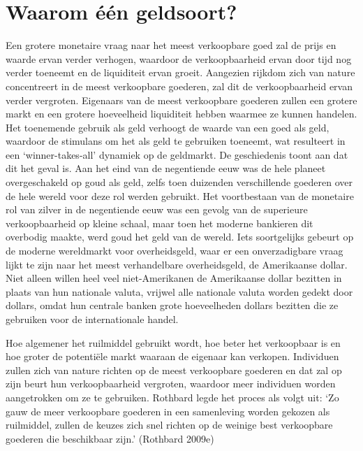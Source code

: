 \documentclass[
  a5paper,
  smalldemyvopaper,11pt,twoside,onecolumn,openright,extrafontsizes,
hidelinks]{memoir}
\begin{document}
\section{Waarom één geldsoort?}\label{waarom-euxe9n-geldsoort}

Een grotere monetaire vraag naar het meest verkoopbare goed zal de prijs
en waarde ervan verder verhogen, waardoor de verkoopbaarheid ervan door
tijd nog verder toeneemt en de liquiditeit ervan groeit. Aangezien
rijkdom zich van nature concentreert in de meest verkoopbare goederen,
zal dit de verkoopbaarheid ervan verder vergroten. Eigenaars van de
meest verkoopbare goederen zullen een grotere markt en een grotere
hoeveelheid liquiditeit hebben waarmee ze kunnen handelen. Het
toenemende gebruik als geld verhoogt de waarde van een goed als geld,
waardoor de stimulans om het als geld te gebruiken toeneemt, wat
resulteert in een `winner-takes-all' dynamiek op de geldmarkt. De
geschiedenis toont aan dat dit het geval is. Aan het eind van de
negentiende eeuw was de hele planeet overgeschakeld op goud als geld,
zelfs toen duizenden verschillende goederen over de hele wereld voor
deze rol werden gebruikt. Het voortbestaan van de monetaire rol van
zilver in de negentiende eeuw was een gevolg van de superieure
verkoopbaarheid op kleine schaal, maar toen het moderne bankieren dit
overbodig maakte, werd goud het geld van de wereld. Iets soortgelijks
gebeurt op de moderne wereldmarkt voor overheidsgeld, waar er een
onverzadigbare vraag lijkt te zijn naar het meest verhandelbare
overheidsgeld, de Amerikaanse dollar. Niet alleen willen heel veel
niet-Amerikanen de Amerikaanse dollar bezitten in plaats van hun
nationale valuta, vrijwel alle nationale valuta worden gedekt door
dollars, omdat hun centrale banken grote hoeveelheden dollars bezitten
die ze gebruiken voor de internationale handel.

Hoe algemener het ruilmiddel gebruikt wordt, hoe beter het verkoopbaar
is en hoe groter de potentiële markt waaraan de eigenaar kan verkopen.
Individuen zullen zich van nature richten op de meest verkoopbare
goederen en dat zal op zijn beurt hun verkoopbaarheid vergroten,
waardoor meer individuen worden aangetrokken om ze te gebruiken.
Rothbard legde het proces als volgt uit: `Zo gauw de meer verkoopbare
goederen in een samenleving worden gekozen als ruilmiddel, zullen de
keuzes zich snel richten op de weinige best verkoopbare goederen die
beschikbaar zijn.' (Rothbard 2009e)
\end{document}
